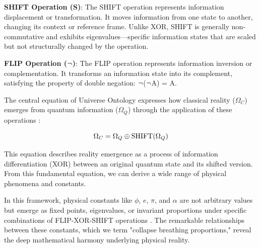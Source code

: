 \textbf{SHIFT Operation (S)}: The SHIFT operation represents information displacement or transformation. It moves information from one state to another, changing its context or reference frame. Unlike XOR, SHIFT is generally non-commutative and exhibits eigenvalues—specific information states that are scaled but not structurally changed by the operation.

\textbf{FLIP Operation ($\neg$)}: The FLIP operation represents information inversion or complementation. It transforms an information state into its complement, satisfying the property of double negation: $\neg$($\neg$A) = A.

The central equation of Universe Ontology expresses how classical reality ($\Omega_C$) emerges from quantum information ($\Omega_Q$) through the application of these operations \cite{ma2025universe}:

\begin{equation}
\Omega_C = \Omega_Q \oplus \text{SHIFT}(\Omega_Q)
\end{equation}

This equation describes reality emergence as a process of information differentiation (XOR) between an original quantum state and its shifted version. From this fundamental equation, we can derive a wide range of physical phenomena and constants.

In this framework, physical constants like $\phi$, $e$, $\pi$, and $\alpha$ are not arbitrary values but emerge as fixed points, eigenvalues, or invariant proportions under specific combinations of FLIP-XOR-SHIFT operations \cite{demanet2016thinking}. The remarkable relationships between these constants, which we term "collapse breathing proportions," reveal the deep mathematical harmony underlying physical reality. 